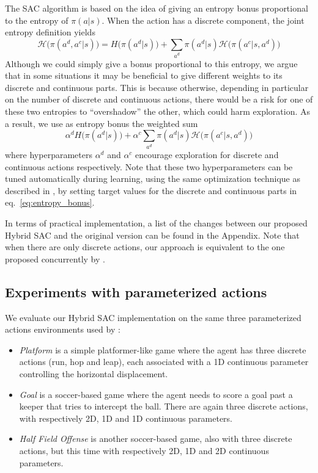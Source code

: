 \documentclass[letterpaper]{article} \usepackage{aaai20}  \usepackage{times}  \usepackage{helvet} \usepackage{courier}  \usepackage[hyphens]{url}  \usepackage{graphicx} \urlstyle{rm} \def\UrlFont{\rm}  \usepackage{graphicx}  \usepackage[section]{placeins}
\renewcommand{\H}{\mathcal{H}}
\newcommand{\citet}{\cite}  \newcommand{\citep}{\cite} \DeclareMathOperator*{\softmax}{softmax}
\begin{document}
The SAC algorithm \citep{haarnoja2018soft} is based on the idea of giving an entropy bonus proportional to the entropy of $\pi(a | s)$.
When the action has a discrete component,
the joint entropy definition yields $$\H\big(\pi(a^d, a^c | s)\big) = H\big(\pi(a^d | s)\big) + \sum_{a^d} \pi(a^d | s) \H\big(\pi(a^c | s, a^d)\big)$$
Although we could simply give a bonus proportional to this entropy, we argue that in some situations it may be beneficial to give different weights to its discrete and continuous parts.
This is because otherwise, depending in particular on the number of discrete and continuous actions, there would be a risk for one of these two entropies to ``overshadow'' the other, which could harm exploration.
As a result, we use as entropy bonus the weighted sum
\begin{equation}
\label{eq:entropy_bonus}
\alpha^d H\big(\pi(a^d | s)\big) + \alpha^c \sum_{a^d} \pi(a^d | s) \H\big(\pi(a^c | s, a^d)\big)
\end{equation}
where hyperparameters $\alpha^d$ and $\alpha^c$ encourage exploration for discrete and continuous actions respectively.
Note that these two hyperparameters can be tuned automatically during learning, using the same optimization technique as described in \citet{haarnoja2018softapplications}, by setting target values for the discrete and continuous parts in eq.~\ref{eq:entropy_bonus}.



In terms of practical implementation, a list of the changes between our proposed Hybrid SAC and the original version can be found in the Appendix. Note that when there are only discrete actions, our approach is equivalent to the one proposed concurrently by \citet{christodoulou2019}.

\subsection{Experiments with parameterized actions}

We evaluate our Hybrid SAC implementation on the same three parameterized actions environments used by \citet{bester2019}:
\begin{itemize}
    \item {\em Platform} is a simple platformer-like game where the agent has three discrete actions (run, hop and leap), each associated with a 1D continuous parameter controlling the horizontal displacement.
    \item {\em Goal} is a soccer-based game where the agent needs to score a goal past a keeper that tries to intercept the ball. There are again three discrete actions, with respectively 2D, 1D and 1D continuous parameters.
    \item {\em Half Field Offense} is another soccer-based game, also with three discrete actions, but this time with respectively 2D, 1D and 2D continuous parameters.
\end{itemize}
\end{document}
